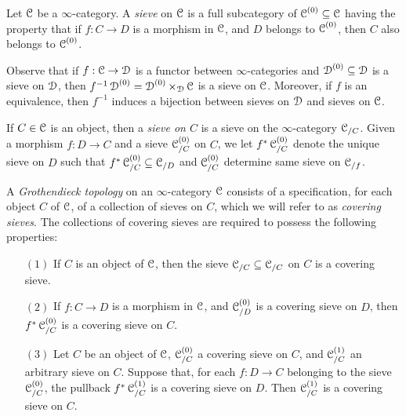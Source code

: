 \begin{definition}\label{grtop}
Let $\operatorname{\mathcal{C}}$ be a $\infty$-category. A {\it sieve} on $\operatorname{\mathcal{C}}$ is a full subcategory of $\operatorname{\mathcal{C}}^{(0)} \subseteq \operatorname{\mathcal{C}}$ having the property that if $f: C \rightarrow D$ is a morphism in $\operatorname{\mathcal{C}}$, and $D$ belongs to $\operatorname{\mathcal{C}}^{(0)}$, then $C$ also belongs to $\operatorname{\mathcal{C}}^{(0)}$.

Observe that if $f: \operatorname{\mathcal{C}} \rightarrow \operatorname{\mathcal{D}}$ is a functor between $\infty$-categories and
$\operatorname{\mathcal{D}}^{(0)} \subseteq \operatorname{\mathcal{D}}$ is a sieve on $\operatorname{\mathcal{D}}$, then $f^{-1} \operatorname{\mathcal{D}}^{(0)} = \operatorname{\mathcal{D}}^{(0)} \times_{\operatorname{\mathcal{D}}} \operatorname{\mathcal{C}}$ is a sieve on $\operatorname{\mathcal{C}}$.
Moreover, if $f$ is an equivalence, then $f^{-1}$ induces a bijection between sieves on
$\operatorname{\mathcal{D}}$ and sieves on $\operatorname{\mathcal{C}}$.

If $C \in \operatorname{\mathcal{C}}$ is an object, then a {\it sieve on $C$} is a sieve on the $\infty$-category $\operatorname{\mathcal{C}}_{/C}$. Given a morphism $f: D \rightarrow C$ and a sieve $\operatorname{\mathcal{C}}^{(0)}_{/C}$ on $C$, we let $f^{\ast} \operatorname{\mathcal{C}}^{(0)}_{/C}$ denote the unique sieve on $D$ such that $f^{\ast} \operatorname{\mathcal{C}}^{(0)}_{/C}
\subseteq \operatorname{\mathcal{C}}_{/D}$ and
$\operatorname{\mathcal{C}}^{(0)}_{/C}$ determine same sieve on $\operatorname{\mathcal{C}}_{/f}$.

A {\it Grothendieck topology} on an $\infty$-category $\operatorname{\mathcal{C}}$ consists of a specification, for each
object $C$ of $\operatorname{\mathcal{C}}$, of a collection of sieves on $C$, which we will refer to as {\it covering sieves}. The collections of covering sieves are required to possess the following properties:

\begin{itemize}
\item[$(1)$] If $C$ is an object of $\operatorname{\mathcal{C}}$, then the sieve $\operatorname{\mathcal{C}}_{/C} \subseteq \operatorname{\mathcal{C}}_{/C}$ on $C$ is a covering sieve.

\item[$(2)$] If $f: C \rightarrow D$ is a morphism in $\operatorname{\mathcal{C}}$, and $\operatorname{\mathcal{C}}^{(0)}_{/D}$ is a covering sieve on $D$, then $f^{\ast} \operatorname{\mathcal{C}}^{(0)}_{/C}$ is a covering sieve on $C$.

\item[$(3)$] Let $C$ be an object of $\operatorname{\mathcal{C}}$, $\operatorname{\mathcal{C}}^{(0)}_{/C}$ a covering sieve on $C$, and $\operatorname{\mathcal{C}}^{(1)}_{/C}$ an arbitrary sieve on $C$. Suppose that, for each $f: D \rightarrow C$ belonging to the sieve $\operatorname{\mathcal{C}}^{(0)}_{/C}$, the pullback
$f^{\ast} \operatorname{\mathcal{C}}^{(1)}_{/C}$ is a covering sieve on $D$. Then $\operatorname{\mathcal{C}}^{(1)}_{/C}$ is a covering sieve on $C$.
\end{itemize}
\end{definition}

